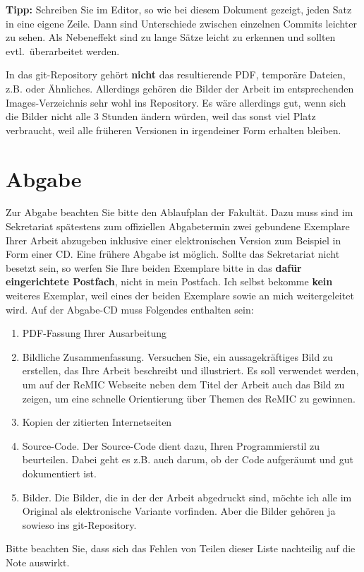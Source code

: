 \textbf{Tipp:} Schreiben Sie im Editor, so wie bei diesem Dokument gezeigt, jeden Satz in eine eigene Zeile.
Dann sind Unterschiede zwischen einzelnen Commits leichter zu sehen.
Als Nebeneffekt sind zu lange Sätze leicht zu erkennen und sollten evtl.~überarbeitet werden.

In das git-Repository gehört \textbf{nicht} das resultierende PDF, temporäre Dateien, z.B.  oder Ähnliches.
Allerdings gehören die Bilder der Arbeit im entsprechenden Images-Verzeichnis sehr wohl ins Repository.
Es wäre allerdings gut, wenn sich die Bilder nicht alle 3 Stunden ändern würden, weil das sonst viel Platz verbraucht, weil alle früheren Versionen in irgendeiner Form erhalten bleiben.

\section{Abgabe}
\label{abgabe}

Zur Abgabe beachten Sie bitte den Ablaufplan der Fakultät.
Dazu muss sind im Sekretariat spätestens zum offiziellen Abgabetermin zwei gebundene Exemplare Ihrer Arbeit abzugeben inklusive einer elektronischen Version zum Beispiel in Form einer CD.
Eine frühere Abgabe ist möglich.
Sollte das Sekretariat nicht besetzt sein, so werfen Sie Ihre beiden Exemplare bitte in das \textbf{dafür eingerichtete Postfach}, nicht in mein Postfach.
Ich selbst bekomme \textbf{kein} weiteres Exemplar, weil eines der beiden Exemplare sowie an mich weitergeleitet wird.
Auf der Abgabe-CD muss Folgendes enthalten sein:
\begin{enumerate}
\item PDF-Fassung Ihrer Ausarbeitung
\item Bildliche Zusammenfassung. Versuchen Sie, ein aussagekräftiges Bild zu erstellen, das Ihre Arbeit beschreibt und illustriert.
Es soll verwendet werden, um auf der ReMIC Webseite neben dem Titel der Arbeit auch das Bild zu zeigen, um eine schnelle Orientierung über Themen des ReMIC zu gewinnen.
\item Kopien der zitierten Internetseiten
\item Source-Code. Der Source-Code dient dazu, Ihren Programmierstil zu beurteilen. Dabei geht es z.B. auch darum, ob der Code aufgeräumt und gut dokumentiert ist.
\item Bilder. Die Bilder, die in der der Arbeit abgedruckt sind, möchte ich alle im Original als elektronische Variante vorfinden.
Aber die Bilder gehören ja sowieso ins git-Repository.
\end{enumerate}
Bitte beachten Sie, dass sich das Fehlen von Teilen dieser Liste nachteilig auf die Note auswirkt.


